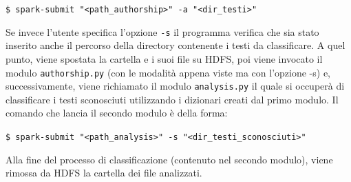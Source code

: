 \documentclass[titlepage]{article}
\begin{document}
\texttt{\$ spark-submit "<path\_authorship>" -a "<dir\_testi>"}
\bigskip

\noindent
Se invece l'utente specifica l'opzione \texttt{-s} il programma verifica che sia stato inserito anche il percorso della directory contenente i testi da classificare. A quel punto, viene spostata la cartella e i suoi file su HDFS, poi viene invocato il modulo \texttt{authorship.py} (con le modalità appena viste ma con l'opzione -s) e, successivamente, viene richiamato il modulo \texttt{analysis.py} il quale si occuperà di classificare i testi sconosciuti utilizzando i dizionari creati dal primo modulo. Il comando che lancia il secondo modulo è della forma:
\bigskip

\texttt{\$ spark-submit "<path\_analysis>" -s "<dir\_testi\_sconosciuti>"}
\bigskip

\noindent
Alla fine del processo di classificazione (contenuto nel secondo modulo), viene rimossa da HDFS la cartella dei file analizzati.
\end{document}
